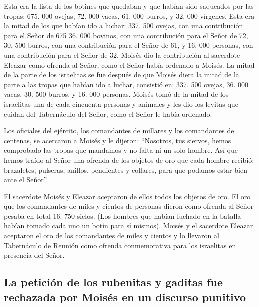  Esta era la lista de los botines que quedaban y que
habían sido saqueados por las tropas: 675. 000 ovejas, 
72. 000 vacas,  61. 000 burros,  y 32. 000
vírgenes.  Esta era la mitad de los que habían ido a
luchar: 337. 500 ovejas,  con una contribución para el
Señor de 675  36. 000 bovinos, con una contribución para
el Señor de 72,  30. 500 burros, con una contribución
para el Señor de 61,  y 16. 000 personas, con una
contribución para el Señor de 32.  Moisés dio la
contribución al sacerdote Eleazar como ofrenda al Señor, como el Señor
había ordenado a Moisés.  La mitad de la parte de los
israelitas se fue después de que Moisés diera la mitad de la parte a las
tropas que habían ido a luchar,  consistió en: 337. 500
ovejas,  36. 000 vacas,  30. 500 burros,
 y 16. 000 personas.  Moisés tomó de la
mitad de los israelitas una de cada cincuenta personas y animales y les
dio los levitas que cuidan del Tabernáculo del Señor, como el Señor le
había ordenado.

 Los oficiales del ejército, los comandantes de millares
y los comandantes de centenas, se acercaron a Moisés  y
le dijeron: ``Nosotros, tus siervos, hemos comprobado las tropas que
mandamos y no falta ni un solo hombre.  Así que hemos
traído al Señor una ofrenda de los objetos de oro que cada hombre
recibió: brazaletes, pulseras, anillos, pendientes y collares, para que
podamos estar bien ante el Señor''.

 El sacerdote Moisés y Eleazar aceptaron de ellos todos
los objetos de oro.  El oro que los comandantes de miles
y cientos de personas dieron como ofrenda al Señor pesaba en total 16.
750 siclos.  (Los hombres que habían luchado en la
batalla habían tomado cada uno un botín para sí mismos). 
Moisés y el sacerdote Eleazar aceptaron el oro de los comandantes de
miles y cientos y lo llevaron al Tabernáculo de Reunión como ofrenda
conmemorativa para los israelitas en presencia del Señor.

\hypertarget{la-peticiuxf3n-de-los-rubenitas-y-gaditas-fue-rechazada-por-moisuxe9s-en-un-discurso-punitivo}{%
\subsection{La petición de los rubenitas y gaditas fue rechazada por
Moisés en un discurso
punitivo}\label{la-peticiuxf3n-de-los-rubenitas-y-gaditas-fue-rechazada-por-moisuxe9s-en-un-discurso-punitivo}}

